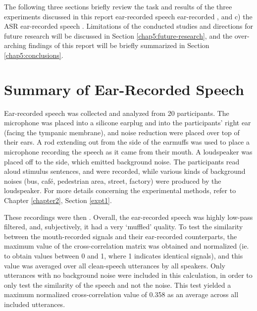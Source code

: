 \DIFdelend The following three sections briefly review the task and results of the three experiments discussed in this report \DIFdelbegin {}\DIFdelend \DIFaddbegin {}\DIFaddend ear-recorded speech \DIFdelbegin {}\DIFdelend \DIFaddbegin {}\DIFaddend ear-recorded \DIFdelbegin {}\DIFdelend \DIFaddbegin {}\DIFaddend , and c) the ASR \DIFdelbegin {}\DIFdelend \DIFaddbegin {}\DIFaddend ear-recorded speech \DIFdelbegin {}\DIFdelend \DIFaddbegin {}\DIFaddend .  Limitations of the conducted studies and directions for future research will be discussed in Section \ref{chap5:future-research}, and the over-arching findings of this report will be briefly summarized in Section \ref{chap5:conclusions}.


\section{Summary of Ear-Recorded Speech}\label{sec:chap2-review}

Ear-recorded speech was collected and analyzed from 20 participants.  The microphone was placed into a silicone earplug and into the participants' right ear (facing the tympanic membrane), and noise reduction \DIFdelbegin {}\DIFdelend \DIFaddbegin {}\DIFaddend were placed over top of their ears.  A rod extending out from the side of the earmuffs was used to place a microphone recording the speech as it came from their mouth.  A loudspeaker was placed off to the side, which emitted background noise.  The participants read aloud stimulus sentences, and were recorded, while various kinds of background noises (bus, caf\'{e}, pedestrian area, street, factory) were produced by the loudspeaker.  For more details concerning the experimental methods, refer to Chapter \ref{chapter2}, Section \ref{expt1}.

These recordings were then \DIFdelbegin {}\DIFdelend \DIFaddbegin {}\DIFaddend .  Overall, the ear-recorded speech was highly low-pass filtered, and, subjectively, it had a very `muffled' quality.  To test the similarity between the mouth-recorded signals and their ear-recorded counterparts, the maximum value of the cross-correlation matrix was obtained and normalized (ie. to obtain values between 0 and 1, where 1 indicates identical signals), and this value was averaged over all clean-speech utterances by all speakers.  Only utterances with no background noise were included in this calculation, in order to only test the similarity of the speech and not the noise.  This test yielded a maximum normalized cross-correlation value of 0.358 as an average across all included utterances.

